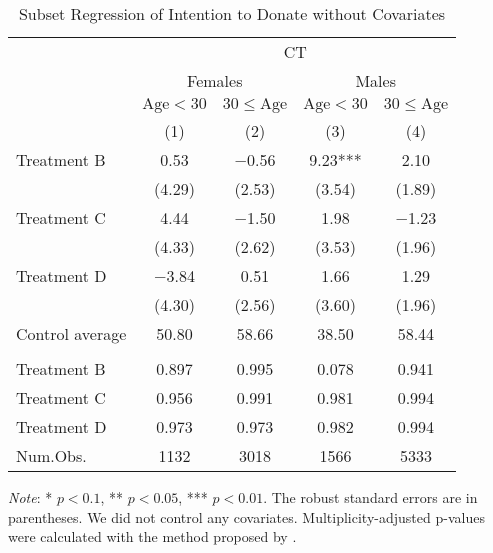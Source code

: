 \documentclass[12pt, a4paper]{article}
\begin{document}
\begin{table}[H]

\caption{\label{tab:int-lm-subset1}Subset Regression of Intention to Donate without Covariates}
\centering
\fontsize{8}{10}\selectfont
\begin{threeparttable}
\begin{tabular}[t]{lcccc}
\toprule
\multicolumn{1}{c}{ } & \multicolumn{4}{c}{CT} \\
\cmidrule(l{3pt}r{3pt}){2-5}
\multicolumn{1}{c}{ } & \multicolumn{2}{c}{Females} & \multicolumn{2}{c}{Males} \\
\cmidrule(l{3pt}r{3pt}){2-3} \cmidrule(l{3pt}r{3pt}){4-5}
\multicolumn{1}{c}{ } & \multicolumn{1}{c}{$\text{Age} < 30$} & \multicolumn{1}{c}{$30 \le \text{Age}$} & \multicolumn{1}{c}{$\text{Age} < 30$} & \multicolumn{1}{c}{$30 \le \text{Age}$} \\
\cmidrule(l{3pt}r{3pt}){2-2} \cmidrule(l{3pt}r{3pt}){3-3} \cmidrule(l{3pt}r{3pt}){4-4} \cmidrule(l{3pt}r{3pt}){5-5}
  & (1) & (2) & (3) & (4)\\
\midrule
Treatment B & \num{0.53} & \num{-0.56} & \num{9.23}*** & \num{2.10}\\
 & (\num{4.29}) & (\num{2.53}) & (\num{3.54}) & (\num{1.89})\\
Treatment C & \num{4.44} & \num{-1.50} & \num{1.98} & \num{-1.23}\\
 & (\num{4.33}) & (\num{2.62}) & (\num{3.53}) & (\num{1.96})\\
Treatment D & \num{-3.84} & \num{0.51} & \num{1.66} & \num{1.29}\\
 & (\num{4.30}) & (\num{2.56}) & (\num{3.60}) & (\num{1.96})\\
\midrule
Control average & 50.80 & 58.66 & 38.50 & 58.44\\
\addlinespace[0.3em]
\multicolumn{5}{l}{\textit{Multiplicity-adjusted p-values}}\\
\hspace{1em}Treatment B & 0.897 & 0.995 & 0.078 & 0.941\\
\hspace{1em}Treatment C & 0.956 & 0.991 & 0.981 & 0.994\\
\hspace{1em}Treatment D & 0.973 & 0.973 & 0.982 & 0.994\\
Num.Obs. & \num{1132} & \num{3018} & \num{1566} & \num{5333}\\
\bottomrule
\end{tabular}
\begin{tablenotes}
\item \emph{Note}: * $p < 0.1$, ** $p < 0.05$, *** $p < 0.01$. The robust standard errors are in parentheses. We did not control any covariates. Multiplicity-adjusted p-values were calculated with the method proposed by \cite{List2019}.
\end{tablenotes}
\end{threeparttable}
\end{table}
\end{document}
